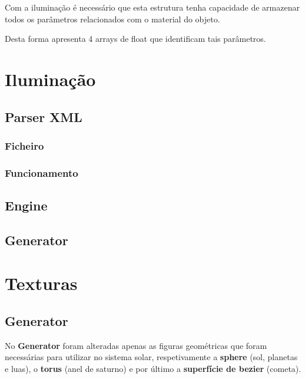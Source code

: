\documentclass[a4paper]{article}
\begin{document}
Com a iluminação é necessário que esta estrutura tenha capacidade de armazenar todos os parâmetros relacionados com o material do objeto.

Desta forma apresenta 4 arrays de float que identificam tais parâmetros.




\section{Iluminação}
\label{sec:iluminacao}

\subsection{Parser XML}
\label{sec:parseri}

\subsubsection{Ficheiro}
\label{sec:ficheiroi}

\subsubsection{Funcionamento}
\label{sec:funcionamentoi}

\subsection{Engine}
\label{sec:enginei}

\subsection{Generator}
\label{sec:generatori}

\section{Texturas}
\label{sec:texturas}

\subsection{Generator}
\label{sec:generatort}

No \textbf{Generator} foram alteradas apenas as figuras geométricas que foram necessárias para utilizar no sistema solar, respetivamente a \textbf{sphere} (sol, planetas e luas), o \textbf{torus} (anel de saturno) e por último a \textbf{superfície de bezier} (cometa).
\end{document}
